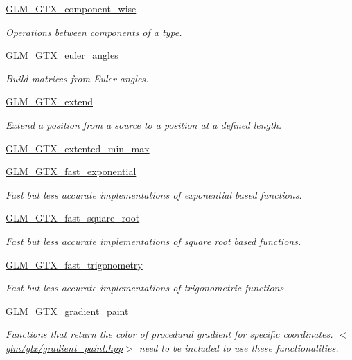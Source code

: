 \begin{DoxyCompactItemize}
\hyperlink{group__gtx__component__wise}{G\+L\+M\+\_\+\+G\+T\+X\+\_\+component\+\_\+wise}
\begin{DoxyCompactList}\small\item\em Operations between components of a type. \end{DoxyCompactList}\item 
\hyperlink{group__gtx__euler__angles}{G\+L\+M\+\_\+\+G\+T\+X\+\_\+euler\+\_\+angles}
\begin{DoxyCompactList}\small\item\em Build matrices from Euler angles. \end{DoxyCompactList}\item 
\hyperlink{group__gtx__extend}{G\+L\+M\+\_\+\+G\+T\+X\+\_\+extend}
\begin{DoxyCompactList}\small\item\em Extend a position from a source to a position at a defined length. \end{DoxyCompactList}\item 
\hyperlink{group__gtx__extented__min__max}{G\+L\+M\+\_\+\+G\+T\+X\+\_\+extented\+\_\+min\+\_\+max}
\item 
\hyperlink{group__gtx__fast__exponential}{G\+L\+M\+\_\+\+G\+T\+X\+\_\+fast\+\_\+exponential}
\begin{DoxyCompactList}\small\item\em Fast but less accurate implementations of exponential based functions. \end{DoxyCompactList}\item 
\hyperlink{group__gtx__fast__square__root}{G\+L\+M\+\_\+\+G\+T\+X\+\_\+fast\+\_\+square\+\_\+root}
\begin{DoxyCompactList}\small\item\em Fast but less accurate implementations of square root based functions. \end{DoxyCompactList}\item 
\hyperlink{group__gtx__fast__trigonometry}{G\+L\+M\+\_\+\+G\+T\+X\+\_\+fast\+\_\+trigonometry}
\begin{DoxyCompactList}\small\item\em Fast but less accurate implementations of trigonometric functions. \end{DoxyCompactList}\item 
\hyperlink{group__gtx__gradient__paint}{G\+L\+M\+\_\+\+G\+T\+X\+\_\+gradient\+\_\+paint}
\begin{DoxyCompactList}\small\item\em Functions that return the color of procedural gradient for specific coordinates. $<$\hyperlink{gradient__paint_8hpp}{glm/gtx/gradient\+\_\+paint.\+hpp}$>$ need to be included to use these functionalities. \end{DoxyCompactList}\item 

\end{DoxyCompactItemize}
